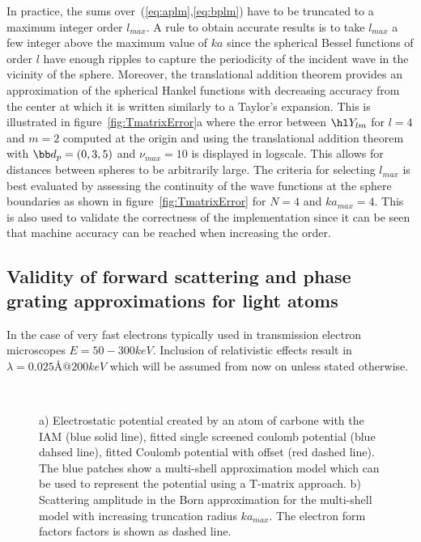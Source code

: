 In practice, the sums over~(\ref{eq:aplm},\ref{eq:bplm}) have to be truncated to
a maximum integer order $l_{max}$.
A rule to obtain accurate results is to take $l_{max}$ a few integer
above the maximum value of $ka$ since the spherical Bessel functions of
order $l$ have enough ripples to capture the periodicity of the incident wave
in the vicinity of the sphere. Moreover, the translational addition theorem
provides an approximation of the spherical Hankel functions with decreasing
accuracy from the center at which it is written similarly to a Taylor's expansion.
This is illustrated in figure~\ref{fig:TmatrixError}a where the error between
$\hl Y_{lm}$ for $l=4$ and $m=2$ computed at the origin and using the
translational addition theorem with $\bb d_p = (0,3,5)$ and $\nu_{max}=10$ is
displayed in logscale. This allows for distances between spheres to be arbitrarily large.
The criteria for selecting $l_{max}$ is best evaluated by assessing the
continuity of the wave functions at the sphere boundaries as shown in
figure~\ref{fig:TmatrixError} for $N=4$ and $ka_{max}=4$.
This is also used to validate the correctness of the implementation
since it can be seen that machine accuracy can be reached when increasing
the order.



\subsection{Validity of forward scattering and phase grating approximations
 for light atoms}



In the case of very fast electrons typically used in transmission electron
microscopes $E=50-300keV$. Inclusion of relativistic effects result in
$\lambda=0.025\text{\AA}@200keV$ which will be assumed from now on unless stated
otherwise.

\begin{figure}[h!]
  \centering
  \\
  \vspace{-1.1em}
\caption{
a) Electrostatic potential created by an atom of carbone with
the IAM (blue solid line),
fitted single screened coulomb potential (blue dahsed line),
fitted Coulomb potential with offset (red dashed line).
The blue patches show a multi-shell approximation model which can be used
to represent the potential using a T-matrix approach.
b) Scattering amplitude in the Born approximation for the multi-shell model
with increasing truncation radius $ka_{max}$. The electron form factors factors
is shown as dashed line.
}\label{fig:IAM}
\end{figure}


